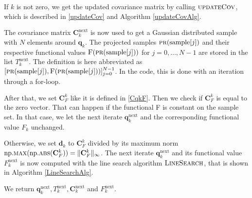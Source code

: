 If $k$ is not zero, we get the updated covariance matrix by calling $\textproc{updateCov}$, which is described in \eqref{updateCov} and Algorithm \ref{updateCovAlg}.

The covariance matrix $\mathbf{C}^\mathrm{next}_k$ is now used to get a Gaussian distributed sample with $N$ elements around $\mathbf{q}_k$. The projected samples $\Call{pr}{\mathrm{sample}[j]}$ and their respective functional values $\Call{F}{\protect\Call{pr}{\mathrm{sample}[j]}}$ for $j=0,\dotsc,N-1$ are stored in the list $T^\mathrm{next}_k$. The definition is here abbreviated as $[\Call{pr}{\mathrm{sample}[j]},\Call{F}{\protect\Call{pr}{\mathrm{sample}[j]}}]_{j=0}^{N-1}$. In the code, this is done with an iteration through a for-loop.

After that, we set $\mathbf{C}^k_F$ like it is defined in \eqref{CqkF}. Then we check if $\mathbf{C}^k_F$ is equal to the zero vector. That can happen if the functional F is constant on the sample set. In that case, we let the next iterate $\mathbf{q}^\mathrm{next}_k$ and the corresponding functional value $F_k$ unchanged.

Otherwise, we set $\mathbf{d}_k$ to $\mathbf{C}^k_F$ divided by its maximum norm $\mathrm{np.}\Call{max}{\mathrm{np.}\protect\Call{abs}{\mathbf{C}^k_F}}=\|\mathbf{C}^k_F\|_\infty$. The next iterate $\mathbf{q}^\mathrm{next}_{k}$ and its functional value $F^\mathrm{next}_k$ is now computed with the line search algorithm $\textproc{LineSearch}$, that is shown in Algorithm \ref{LineSearchAlg}.

We return $\mathbf{q}^\mathrm{next}_k,T^\mathrm{next}_k,\mathbf{C}^\mathrm{next}_k$ and $F^\mathrm{next}_k$.


